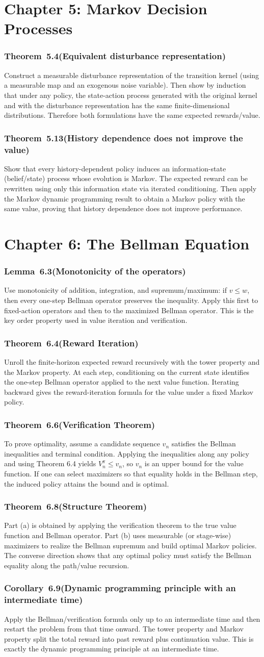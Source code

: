 \documentclass[11pt,a4paper]{article}
\newcommand{\proofcapsule}[4]{%
  \subsubsection*{#1~#2\quad \textnormal{\small(#3)}}%
  #4}
\begin{document}
\section{Chapter 5: Markov Decision Processes}
\proofcapsule{Theorem}{5.4}{Equivalent disturbance representation}{Construct a measurable disturbance representation of the transition kernel (using a measurable map and an exogenous noise variable). Then show by induction that under any policy, the state-action process generated with the original kernel and with the disturbance representation has the same finite-dimensional distributions. Therefore both formulations have the same expected rewards/value.}
\proofcapsule{Theorem}{5.13}{History dependence does not improve the value}{Show that every history-dependent policy induces an information-state (belief/state) process whose evolution is Markov. The expected reward can be rewritten using only this information state via iterated conditioning. Then apply the Markov dynamic programming result to obtain a Markov policy with the same value, proving that history dependence does not improve performance.}
\section{Chapter 6: The Bellman Equation}
\proofcapsule{Lemma}{6.3}{Monotonicity of the operators}{Use monotonicity of addition, integration, and supremum/maximum: if $v\le w$, then every one-step Bellman operator preserves the inequality. Apply this first to fixed-action operators and then to the maximized Bellman operator. This is the key order property used in value iteration and verification.}
\proofcapsule{Theorem}{6.4}{Reward Iteration}{Unroll the finite-horizon expected reward recursively with the tower property and the Markov property. At each step, conditioning on the current state identifies the one-step Bellman operator applied to the next value function. Iterating backward gives the reward-iteration formula for the value under a fixed Markov policy.}
\proofcapsule{Theorem}{6.6}{Verification Theorem}{To prove optimality, assume a candidate sequence $v_n$ satisfies the Bellman inequalities and terminal condition. Applying the inequalities along any policy and using Theorem 6.4 yields $V_n^\pi\le v_n$, so $v_n$ is an upper bound for the value function. If one can select maximizers so that equality holds in the Bellman step, the induced policy attains the bound and is optimal.}
\proofcapsule{Theorem}{6.8}{Structure Theorem}{Part (a) is obtained by applying the verification theorem to the true value function and Bellman operator. Part (b) uses measurable (or stage-wise) maximizers to realize the Bellman supremum and build optimal Markov policies. The converse direction shows that any optimal policy must satisfy the Bellman equality along the path/value recursion.}
\proofcapsule{Corollary}{6.9}{Dynamic programming principle with an intermediate time}{Apply the Bellman/verification formula only up to an intermediate time and then restart the problem from that time onward. The tower property and Markov property split the total reward into past reward plus continuation value. This is exactly the dynamic programming principle at an intermediate time.}
\end{document}
